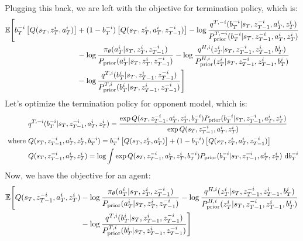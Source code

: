 Plugging this back, we are left with the objective for termination policy, which is:
\begin{equation}
\begin{aligned}
    \mathbb{E}\Bigg[b^{-i}_T\left[ Q(s_T, z^i_T, a^{i}_T) \right] &+ (1-b^{-i}_T)\left[ Q(s_T, z^i_T, a^{i}_T, z^{-i}_{T-1}) \right] - \log\frac{q^{T,-i}(b^{-i}_T | s_T,  z^{-i}_{T-1}, a^i_T, z^i_T)}{P^{T,-i}_{\text{prior}}(b^{-i}_T | s_T,  z^{-i}_{T-1}, a^i_T, z^i_T)} \\
    &- \log\frac{\pi_\theta(a^i_T | s_T, z^i_T, z^{-i}_{T-1})}{P_{\text{prior}}(a^i_T | s_T, z^i_T, z^{-i}_{T-1})} - \log\frac{q^{H, i}(z^i_T | s_T, z^{-i}_{T-1}, z^i_{T-1}, b^i_T)}{P^{H, i}_{\text{prior}}(z^i_T | s_T, z^{-i}_{T-1}, z^i_{T-1}, b^i_T)}\\
    &- \log\frac{q^{T,i}(b^i_T | s_T, z^i_{T-1}, z^{-i}_{T-1})}{P^{T,i}_{\text{prior}}(b^i_T | s_T, z^i_{T-1}, z^{-i}_{T-1})}\Bigg]
\end{aligned}
\end{equation}
Let's optimize the termination policy for opponent model, which is:
\begin{equation}
\begin{aligned}
    &q^{T,-i}(b^{-i}_T | s_T,  z^{-i}_{T-1}, a^i_T, z^i_T) = \frac{\exp Q(s_T,  z^{-i}_{T-1}, a^i_T, z^i_T, b^{-i}_T) P_{\text{prior}}(b^{-i}_T | s_T,  z^{-i}_{T-1}, a^i_T, z^i_T)}{\exp Q(s_T,  z^{-i}_{T-1}, a^i_T, z^i_T)} \\
    \text{ where }&Q(s_T,  z^{-i}_{T-1}, a^i_T, z^i_T, b^{-i}_T) = b^{-i}_T\left[ Q(s_T, z^i_T, a^{i}_T) \right] + (1-b^{-i}_T)\left[ Q(s_T, z^i_T, a^{i}_T, z^{-i}_{T-1}) \right] \\
    &Q(s_T,  z^{-i}_{T-1}, a^i_T, z^i_T) = \log \int \exp Q(s_T,  z^{-i}_{T-1}, a^i_T, z^i_T, b^{-i}_T) P_{\text{prior}}(b^{-i}_T | s_T,  z^{-i}_{T-1}, a^i_T, z^i_T) \ \mathrm{d} b^{-i}_T
\end{aligned}
\end{equation}
Now, we have the objective for an agent:
\begin{equation}
\begin{aligned}
    \mathbb{E}\Bigg[Q(s_T,  z^{-i}_{T-1}, a^i_T, z^i_T) &- \log\frac{\pi_\theta(a^i_T | s_T, z^i_T, z^{-i}_{T-1})}{P_{\text{prior}}(a^i_T | s_T, z^i_T, z^{-i}_{T-1})} - \log\frac{q^{H, i}(z^i_T | s_T, z^{-i}_{T-1}, z^i_{T-1}, b^i_T)}{P^{H, i}_{\text{prior}}(z^i_T | s_T, z^{-i}_{T-1}, z^i_{T-1}, b^i_T)} \\
    &- \log\frac{q^{T,i}(b^i_T | s_T, z^i_{T-1}, z^{-i}_{T-1})}{P^{T,i}_{\text{prior}}(b^i_T | s_T, z^i_{T-1}, z^{-i}_{T-1})}\Bigg]
\end{aligned}
\end{equation}
